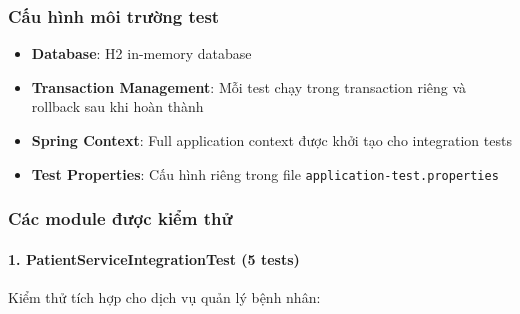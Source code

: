 \subsubsection{Cấu hình môi trường test}

\begin{itemize}
    \item \textbf{Database}: H2 in-memory database
    \item \textbf{Transaction Management}: Mỗi test chạy trong transaction riêng và rollback sau khi hoàn thành
    \item \textbf{Spring Context}: Full application context được khởi tạo cho integration tests
    \item \textbf{Test Properties}: Cấu hình riêng trong file \texttt{application-test.properties}
\end{itemize}

\subsubsection{Các module được kiểm thử}

\paragraph{1. PatientServiceIntegrationTest (5 tests)}

Kiểm thử tích hợp cho dịch vụ quản lý bệnh nhân:


